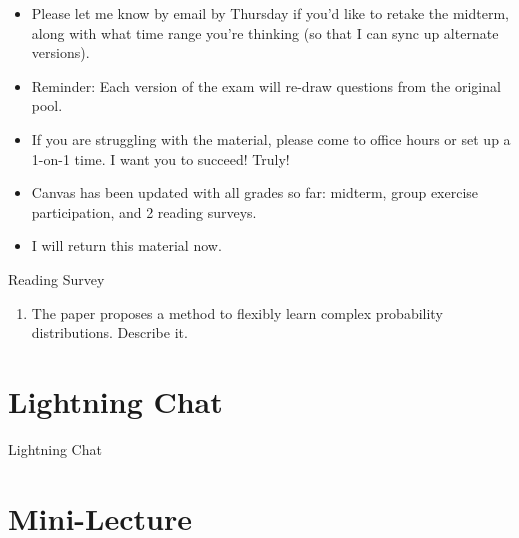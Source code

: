 \documentclass[10pt]{beamer}
\begin{document}
\begin{frame}
\begin{myredbox}[title=Announcements on grades]

\begin{itemize}
	\item Please let me know by email by Thursday if you'd like to retake the midterm, along with what time range you're thinking (so that I can sync up alternate versions). \pause
	\item Reminder:  Each version of the exam will re-draw questions from the original pool. \pause 
	\item If you are struggling with the material, please come to office hours or set up a 1-on-1 time. I want you to succeed!  Truly! \pause 
	\item Canvas has been updated with all grades so far: midterm, group exercise participation, and 2 reading surveys.
	\item I will return this material now.
\end{itemize}
\end{myredbox}
\end{frame}


\begin{frame}{Reading Survey}

\begin{enumerate}
	\item The paper proposes a method to flexibly learn complex probability distributions. Describe it.
\end{enumerate}
	
\end{frame}



\section{Lightning Chat}

\begin{frame}[standout]
Lightning Chat
\end{frame}

\section{Mini-Lecture}
\end{document}
